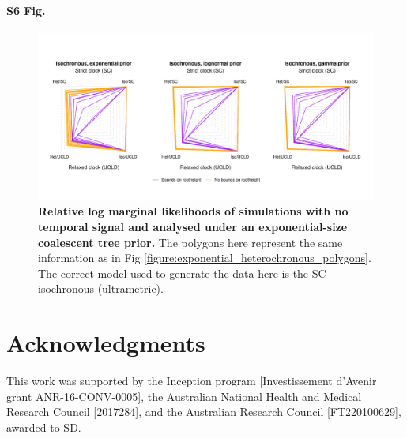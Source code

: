 \documentclass[10pt,letterpaper]{article}
\begin{document}
\paragraph*{S6 Fig.}
\begin{figure}[!h]
	\begin{center}
		\includegraphics[width=14cm]{sandbox_figures/iso_sims.pdf}\newline
		\vspace{-0.5cm}
		\caption{\textbf{Relative log marginal likelihoods of simulations with no temporal signal and analysed under an exponential-size coalescent tree prior.} The polygons here represent the same information as in Fig \ref{figure:exponential_heterochronous_polygons}. The correct model used to generate the data here is the SC isochronous (ultrametric).} 
		\label{figure:exponential_ultrametric_polygons}
	\end{center}
\end{figure}


\section*{Acknowledgments}
This work was supported by the Inception program [Investissement d’Avenir grant ANR-16-CONV-0005], the Australian National Health and Medical Research Council [2017284], and the Australian Research Council [FT220100629], awarded to SD.

\nolinenumbers


%
%
% 

\end{document}
